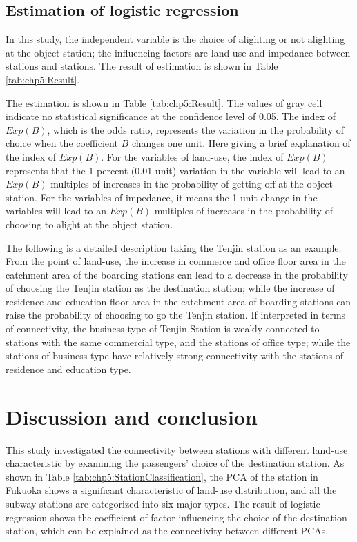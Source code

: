 \subsection{Estimation of logistic regression}
%
In this study, the independent variable is the choice of alighting or not alighting at the object station; the influencing factors are land-use and impedance between stations and stations. The result of estimation is shown in Table \ref{tab:chp5:Result}.


%
The estimation is shown in Table \ref{tab:chp5:Result}. The values of gray cell indicate no statistical significance at the confidence level of 0.05. The index of $Exp(B)$, which is the odds ratio, represents the variation in the probability of choice when the coefficient $B$ changes one unit. Here giving a brief explanation of the index of $Exp(B)$. For the variables of land-use, the index of $Exp(B)$ represents that the 1 percent (0.01 unit) variation in the variable will lead to an $Exp(B)$ multiples of increases in the probability of getting off at the object station. For the variables of impedance, it means the 1 unit change in the variables will lead to an $Exp(B)$ multiples of increases in the probability of choosing to alight at the object station. 

%
The following is a detailed description taking the Tenjin station as an example. From the point of land-use, the increase in commerce and office floor area in the catchment area of the boarding stations can lead to a decrease in the probability of choosing the Tenjin station as the destination station; while the increase of residence and education floor area in the catchment area of boarding stations can raise the probability of choosing to go the Tenjin station. If interpreted in terms of connectivity, the business type of Tenjin Station is weakly connected to stations with the same commercial type, and the stations of office type; while the stations of business type have relatively strong connectivity with the stations of residence and education type. 

%
\section{Discussion and conclusion}
%
This study investigated the connectivity between stations with different land-use characteristic by examining the passengers' choice of the destination station. As shown in Table \ref{tab:chp5:StationClassification}, the PCA of the station in Fukuoka shows a significant characteristic of land-use distribution, and all the subway stations are categorized into six major types. The result of logistic regression shows the coefficient of factor influencing the choice of the destination station, which can be explained as the connectivity between different PCAs.

